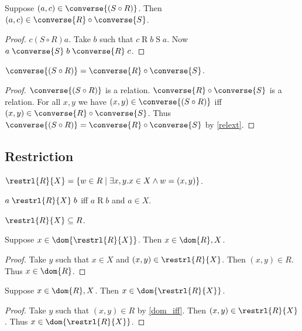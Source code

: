 \begin{proposition}\label{circ_converse_elim}
    Suppose $(a,c)\in \converse{(S\circ R)}$.
    Then $(a, c) \in\converse{R}\circ\converse{S}$.
\end{proposition}
\begin{proof}
    $c\mathrel{(S\circ R)} a$.
    Take $b$ such that  $c\mathrel{R}b\mathrel{S} a$.
    Now $a\mathrel{\converse{S}} b\mathrel{\converse{R}} c$.
\end{proof}

\begin{proposition}\label{circ_converse}
    $\converse{(S\circ R)} = \converse{R}\circ\converse{S}$.
\end{proposition}
\begin{proof}
    $\converse{(S\circ R)}$ is a relation.
    $\converse{R}\circ\converse{S}$ is a relation.
    For all $x, y $ we have $(x,y)\in \converse{(S\circ R)}$ iff $(x, y) \in\converse{R}\circ\converse{S}$.
    Thus $\converse{(S\circ R)} = \converse{R}\circ\converse{S}$ by \cref{relext}.
\end{proof}

\subsection{Restriction}

\begin{definition}%
\label{restrl}
    $\restrl{R}{X} = \{ w\in R \mid \exists x, y. x\in X \land w = (x, y) \}$.
\end{definition}

\begin{proposition}\label{restrl_iff}
    $a \mathrel{\restrl{R}{X}} b$ iff $a\mathrel{R}b$ and $a\in X$.
\end{proposition}

\begin{proposition}\label{restrl_subseteq}
    $\restrl{R}{X}\subseteq R$.
\end{proposition}

\begin{proposition}%
\label{elem_dom_of_restrl_implies_elem_dom_and_restr}
    Suppose $x\in \dom{\restrl{R}{X}}$.
    Then $x\in \dom{R}, X$.
\end{proposition}
\begin{proof}
    Take $y$ such that $x\in X$ and $(x, y)\in \restrl{R}{X}$.
    Then $(x, y)\in R$. Thus $x\in\dom{R}$.
\end{proof}

\begin{proposition}%
\label{elem_dom_and_restr_implies_elem_of_restr}
    Suppose $x\in \dom{R}, X$.
    Then $x\in \dom{\restrl{R}{X}}$.
\end{proposition}
\begin{proof}
    Take $y$ such that $(x, y)\in R$ by \cref{dom_iff}.
    Then $(x, y)\in \restrl{R}{X}$.
    Thus $x\in\dom{\restrl{R}{X}}$.
\end{proof}

